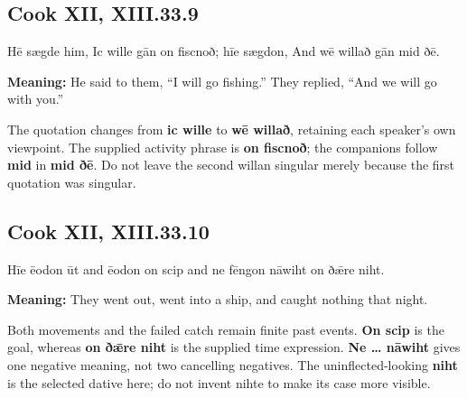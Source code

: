 \par\begin{minipage}{\linewidth}\raggedright
\subsection*{Cook XII, XIII.33.9}

Hē sægde him, Ic wille gān on fiscnoð; hīe sægdon, And wē willað gān mid ðē.

\textbf{Meaning:} He said to them, “I will go fishing.” They replied, “And we will go with you.”

The quotation changes from \textbf{ic wille} to \textbf{wē willað}, retaining each speaker’s own viewpoint. The supplied activity phrase is \textbf{on fiscnoð}; the companions follow \textbf{mid} in \textbf{mid ðē}. Do not leave the second willan singular merely because the first quotation was singular.

\end{minipage}\par\addvspace{4pt}

\par\begin{minipage}{\linewidth}\raggedright
\subsection*{Cook XII, XIII.33.10}

Hīe ēodon ūt and ēodon on scip and ne fēngon nāwiht on ðǣre niht.

\textbf{Meaning:} They went out, went into a ship, and caught nothing that night.

Both movements and the failed catch remain finite past events. \textbf{On scip} is the goal, whereas \textbf{on ðǣre niht} is the supplied time expression. \textbf{Ne … nāwiht} gives one negative meaning, not two cancelling negatives. The uninflected-looking \textbf{niht} is the selected dative here; do not invent nihte to make its case more visible.

\end{minipage}\par\addvspace{4pt}

